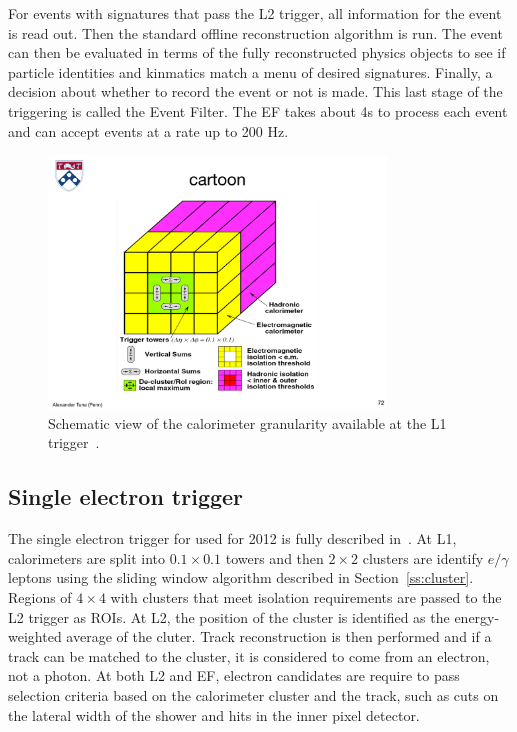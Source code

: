 For events with signatures that pass the L2 trigger, all information for the event is read out. Then the standard offline reconstruction algorithm is run. The event can then be evaluated in terms of the fully reconstructed physics objects to see if particle identities and kinmatics match a menu of desired signatures. Finally, a decision about whether to record the event or not is made. This last stage of the triggering is called the Event Filter. The EF takes about 4s to process each event and can accept events at a rate up to 200 Hz.


\begin{figure}[tp]
  \centering
  \includegraphics[width=0.80\textwidth]{fig/atlas/cartoonL1.pdf}
  \caption{Schematic view of the calorimeter granularity available at the L1 trigger~\cite{TDR-L1}.}
  \label{fig:l1}
\end{figure}
\subsection{Single electron trigger}
The single electron trigger for used for 2012 is fully described in~\cite{eltrig}. At L1, calorimeters are split into $0.1\times0.1$ towers and then $2\times 2$ clusters are identify $e/\gamma$ leptons using the sliding window algorithm described in Section~\ref{ss:cluster}. Regions of $4\times 4$ with clusters that meet isolation requirements are passed to the L2 trigger as ROIs. At L2, the position of the cluster is identified as the energy-weighted average of the cluter. Track reconstruction is then performed and if a track can be matched to the cluster, it is considered to come from an electron, not a photon. At both L2 and EF, electron candidates are require to pass selection criteria based on the calorimeter cluster and the track, such as cuts on the lateral width of the shower and hits in the inner pixel detector.

